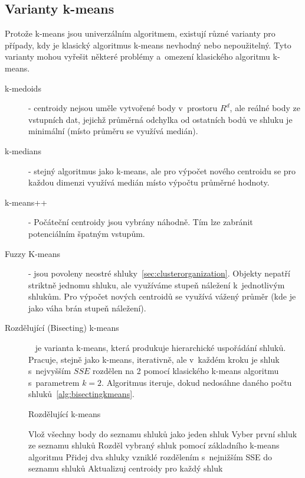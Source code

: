 \subsection{Varianty k-means}
Protože k-means jsou univerzálním algoritmem, existují různé varianty pro případy, kdy je klasický algoritmus k-means nevhodný nebo nepoužitelný. Tyto varianty mohou vyřešit některé problémy a~omezení klasického algoritmu k-means.
\begin{description}
\item[k-medoids] - centroidy nejsou uměle vytvořené body v~prostoru $R^d$, ale reálné body ze vstupních dat, jejichž průměrná odchylka od ostatních bodů ve shluku je minimální (místo průměru se využívá medián).
\item[k-medians] - stejný algoritmus jako k-means, ale pro výpočet nového centroidu se pro každou dimenzi využívá medián místo výpočtu průměrné hodnoty.
\item[k-means++] - Počáteční centroidy jsou vybrány náhodně. Tím lze zabránit potenciálním špatným vstupům.
\item[Fuzzy K-means] - jsou povoleny neostré shluky~\ref{sec:clusterorganization}. Objekty nepatří striktně jednomu shluku, ale využíváme stupeň náležení k~jednotlivým shlukům. Pro výpočet nových centroidů se využívá vážený průměr (kde je jako váha brán stupeň náležení).
\item[Rozdělující (Bisecting) k-means]~\cite{Tan05} je varianta k-means, která produkuje hierarchické uspořádání shluků. Pracuje, stejně jako k-means, iterativně, ale v~každém kroku je shluk s~nejvyšším $SSE$ rozdělen na 2 pomocí klasického k-means algoritmu s~parametrem $k=2$. Algoritmus iteruje, dokud nedosáhne daného počtu shluků~\autoref{alg:bisectingkmeans}.
\begin{algorithm}
\caption{Rozdělující k-means}\label{alg:bisectingkmeans}
\begin{algorithmic}[1]
\State Vlož všechny body do seznamu shluků jako jeden shluk
\Repeat
\State Vyber první shluk ze seznamu shluků
\State Rozděl vybraný shluk pomocí základního k-means algoritmu
\EndFor
\State Přidej dva shluky vzniklé rozdělením s~nejnižším SSE do seznamu shluků
\State Aktualizuj centroidy pro každý shluk
\end{algorithmic}
\end{algorithm}

\end{description}
